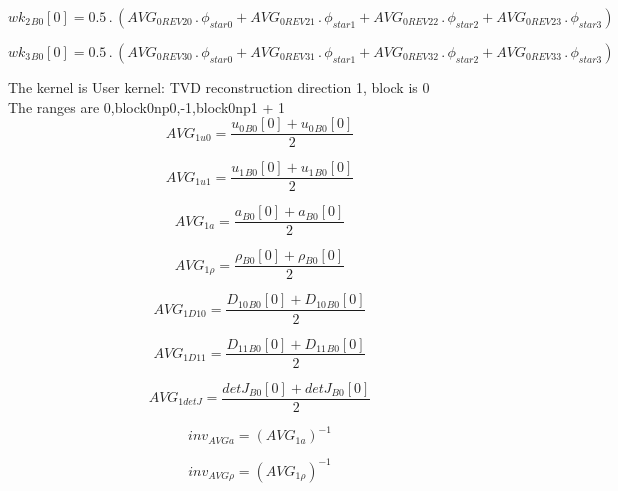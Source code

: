 \documentclass{article}
\begin{document}
\begin{dmath}{wk_{2}{_{B0}}}[{0}] = 0.5 \,.\, \left(AVG_{0 REV 20} \,.\, \phi_{star 0} + AVG_{0 REV 21} \,.\, \phi_{star 1} + AVG_{0 REV 22} \,.\, \phi_{star 2} + AVG_{0 REV 23} \,.\, \phi_{star 3}\right)\end{dmath}

\begin{dmath}{wk_{3}{_{B0}}}[{0}] = 0.5 \,.\, \left(AVG_{0 REV 30} \,.\, \phi_{star 0} + AVG_{0 REV 31} \,.\, \phi_{star 1} + AVG_{0 REV 32} \,.\, \phi_{star 2} + AVG_{0 REV 33} \,.\, \phi_{star 3}\right)\end{dmath}

\noindent The kernel is User kernel: TVD reconstruction direction 1, block is 0\\\noindent The ranges are 0,block0np0,-1,block0np1 + 1\\\begin{dmath}AVG_{1 u0} = \frac{{u_{0}{_{B0}}}[{0}] + {u_{0}{_{B0}}}[{0}]}{2}\end{dmath}

\begin{dmath}AVG_{1 u1} = \frac{{u_{1}{_{B0}}}[{0}] + {u_{1}{_{B0}}}[{0}]}{2}\end{dmath}

\begin{dmath}AVG_{1 a} = \frac{{a{_{B0}}}[{0}] + {a{_{B0}}}[{0}]}{2}\end{dmath}

\begin{dmath}AVG_{1 \rho} = \frac{{\rho{_{B0}}}[{0}] + {\rho{_{B0}}}[{0}]}{2}\end{dmath}

\begin{dmath}AVG_{1 D10} = \frac{{D_{10}{_{B0}}}[{0}] + {D_{10}{_{B0}}}[{0}]}{2}\end{dmath}

\begin{dmath}AVG_{1 D11} = \frac{{D_{11}{_{B0}}}[{0}] + {D_{11}{_{B0}}}[{0}]}{2}\end{dmath}

\begin{dmath}AVG_{1 detJ} = \frac{{detJ{_{B0}}}[{0}] + {detJ{_{B0}}}[{0}]}{2}\end{dmath}

\begin{dmath}inv_{AVG a} = \left(AVG_{1 a} \right)^{-1}\end{dmath}

\begin{dmath}inv_{AVG \rho} = \left(AVG_{1 \rho} \right)^{-1}\end{dmath}
\end{document}
